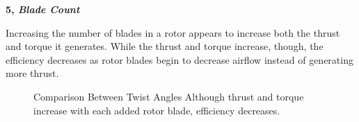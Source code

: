 \documentclass{article}
\begin{document}
\textbf{5, \emph{Blade Count}} \newline

Increasing the number of blades in a rotor appears to increase both the thrust and torque it generates. While the thrust and torque increase, though, the efficiency decreases as rotor blades begin to decrease airflow instead of generating more thrust.

\begin{figure}
  \centering
  \caption{Comparison Between Twist Angles \newline Although thrust and torque increase with each added rotor blade, efficiency decreases.}
  \label{fig:6}
\end{figure}

\clearpage
\end{document}
